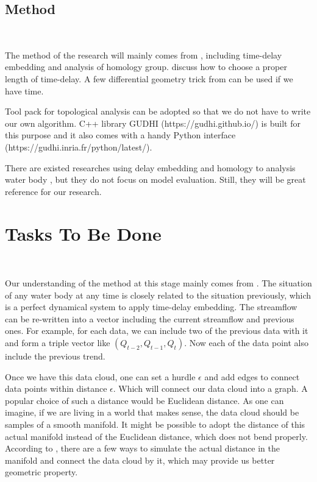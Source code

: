 \documentclass{article}
\begin{document}
\subsection{Method}

\ 

The method of the research will mainly comes from \citep{ref1, ref2, ref3}, including time-delay embedding and analysis of homology group. \citep{ref3} discuss how to choose a proper length of time-delay. A few differential geometry trick from \citep{ref4} can be used if we have time.

Tool pack for topological analysis can be adopted so that we do not have to write our own algorithm. C++ library GUDHI (https://gudhi.github.io/) is built for this purpose and it also comes with a handy Python interface (https://gudhi.inria.fr/python/latest/).

There are existed researches using delay embedding and homology to analysis water body \citep{ref5,ref6,ref7}, but they do not focus on model evaluation. Still, they will be great reference for our research.
\section{Tasks To Be Done}

\ 

Our understanding of the method at this stage mainly comes from \citep{ref1, ref2}. The situation of any water body at any time is closely related to the situation previously, which is a perfect dynamical system to apply time-delay embedding. The streamflow can be re-written into a vector including the current streamflow and previous ones. For example, for each data, we can include two of the previous data with it and form a triple vector like $(Q_{t-2},Q_{t-1},Q_t)$. Now each of the data point also include the previous trend.

Once we have this data cloud, one can set a hurdle $\epsilon$ and add edges to connect data points within distance $\epsilon$. Which will connect our data cloud into a graph. A popular choice of such a distance would be Euclidean distance. As one can imagine, if we are living in a world that makes sense, the data cloud should be samples of a smooth manifold. It might be possible to adopt the distance of this actual manifold instead of the Euclidean distance, which does not bend properly. According to \citep{ref4}, there are a few ways to simulate the actual distance in the manifold and connect the data cloud by it, which may provide us better geometric property.
\end{document}
